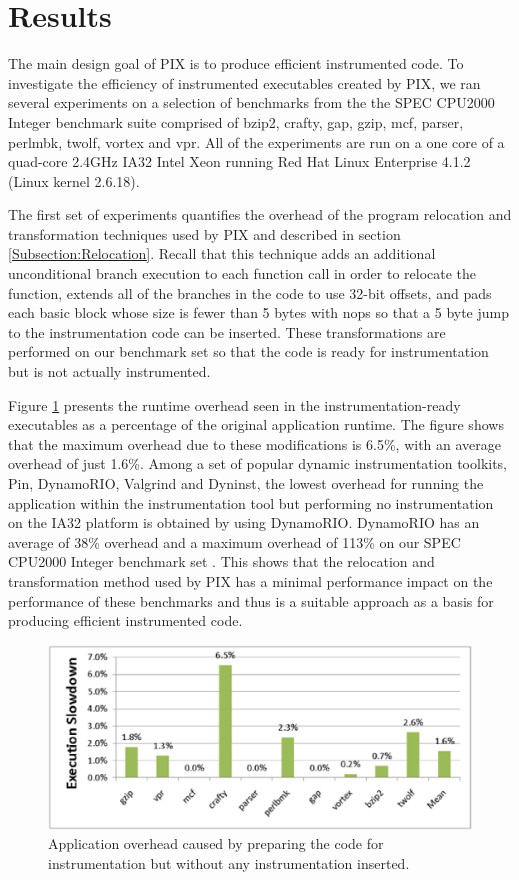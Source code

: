 \section{Results}

The main design goal of PIX is to produce efficient instrumented code. 
To investigate the efficiency of instrumented executables created by PIX, we ran several experiments 
on a selection of benchmarks from the the SPEC CPU2000 Integer benchmark suite comprised of
bzip2, crafty, gap, gzip, mcf, parser, perlmbk, twolf, vortex and vpr. All of the experiments are run on a
one core of a quad-core 2.4GHz IA32 Intel Xeon running Red Hat Linux Enterprise 4.1.2 (Linux kernel 2.6.18). 

The first set of experiments quantifies the overhead of the program relocation and 
transformation techniques used by PIX and
described in section \ref{Subsection:Relocation}. 
Recall that this technique adds an additional unconditional
branch execution to each function call in order to relocate the function, extends all of the branches in the code
to use 32-bit offsets, and pads each basic block whose size is fewer than 5 bytes with nops so that a
5 byte jump to the instrumentation code can be inserted. These transformations are performed on our benchmark set 
so that the code is ready for instrumentation but is not actually instrumented. 

Figure \ref{Figure:RelocOverhead} presents
the runtime overhead seen in the instrumentation-ready executables as a percentage of the original application runtime.
The figure shows that the maximum overhead due to these modifications is 6.5\%, with an
average overhead of just 1.6\%. Among a set of popular dynamic instrumentation toolkits,
Pin, DynamoRIO, Valgrind and Dyninst, the lowest overhead for running the application within the instrumentation
tool but performing no instrumentation
on the IA32 platform is obtained by using DynamoRIO. DynamoRIO has an average of 38\% overhead and a maximum overhead of 113\% on
our SPEC CPU2000 Integer benchmark set \cite{luk2005pin}. This shows that the 
relocation and transformation method used by PIX has a minimal
performance impact on the performance of these benchmarks and thus is a suitable approach as a basis for
producing efficient instrumented code.

\begin{figure}[ht]
\centering
\label{Figure:RelocOverhead}
\includegraphics[scale=0.6]{relocperf.eps}
\caption{Application overhead caused by preparing the code for instrumentation but without
any instrumentation inserted.}
\end{figure}

